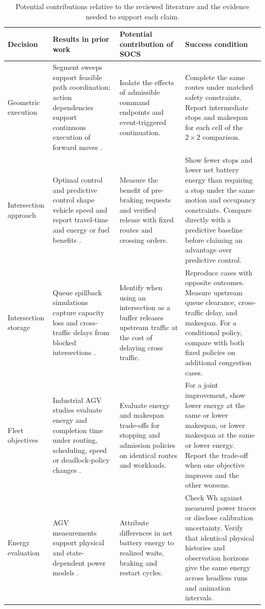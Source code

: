 \documentclass[11pt,a4paper]{article}
\begin{document}
\begin{table}[htbp]
\centering\small
\caption{Potential contributions relative to the reviewed literature and
the evidence needed to support each claim.}
\label{tab:conditional-contributions}
\setlength{\tabcolsep}{4pt}
\begin{tabular}{@{}p{.15\linewidth}p{.24\linewidth}p{.25\linewidth}p{.30\linewidth}@{}}
\toprule
Decision & Results in prior work & Potential contribution of SOCS & Success condition \\
\midrule
Geometric execution & Segment sweeps support feasible path coordination;
action dependencies support continuous execution of forward moves
\cite{odonnell1989,hoenig2019}. & Isolate the effects of admissible command
endpoints and event-triggered continuation. & Complete the same routes under
matched safety constraints. Report intermediate stops and makespan for
each cell of the $2\times2$ comparison. \\[3pt]
Intersection approach & Optimal control and predictive control shape vehicle
speed and report travel-time and energy or fuel benefits
\cite{malikopoulos2018,pan2021}. & Measure the benefit of pre-braking requests
and verified release with fixed routes and crossing orders. & Show fewer
stops and lower net battery energy than requiring a stop under the same
motion and occupancy constraints. Compare directly with a predictive
baseline before claiming an advantage over predictive control. \\[3pt]
Intersection storage & Queue spillback simulations capture capacity loss
and cross-traffic delays from blocked intersections \cite{verbeke2008}. &
Identify when using an intersection as a buffer releases upstream traffic
at the cost of delaying cross traffic. & Reproduce cases with opposite
outcomes. Measure upstream queue clearance, cross-traffic delay, and
makespan. For a conditional policy, compare with both fixed policies on
additional congestion cases. \\[3pt]
Fleet objectives & Industrial AGV studies evaluate energy and completion
time under routing, scheduling, speed or deadlock-policy changes
\cite{riazi2021,malopolski2025}. & Evaluate energy and makespan trade-offs
for stopping and admission policies on identical routes and workloads. &
For a joint improvement, show lower energy at the same or lower makespan,
or lower makespan at the same or lower energy. Report the trade-off when
one objective improves and the other worsens. \\[3pt]
Energy evaluation & AGV measurements support physical and state-dependent
power models \cite{meissner2020,sperling2024}. & Attribute differences in net
battery energy to realized waits, braking and restart cycles. & Check Wh
against measured power traces or disclose calibration uncertainty. Verify
that identical physical histories and observation horizons give the same
energy across headless runs and animation intervals. \\
\bottomrule
\end{tabular}
\end{table}
\end{document}
